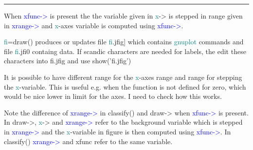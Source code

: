 \vspace{-7mm} \rule{5cm}{0.1pt} 
\onehalfspacing 
\begin{note} 
When \textcolor{blue}{xfunc->} is present the the variable given in \textcolor{teal}{x}-> is stepped in range given in \textcolor{blue}{xrange->} 
and \textcolor{teal}{x}-axes variable is computed using \textcolor{blue}{xfunc->}. 
\end{note} 
\begin{note} 
\textcolor{teal}{fi}=\textcolor{VioletRed}{draw}() produces or updates file \textcolor{teal}{fi}.jfig] which contains 
\textcolor{teal}{gnuplot} commands and file \textcolor{teal}{fi}.jfi0 containg data. If scandic characters are needed 
for labels, the edit these characters into fi.jfig and use \textcolor{VioletRed}{show}('fi.jfig') 
\end{note} 
\begin{note} 
It is possible to have different range for the \textcolor{teal}{x}-axes range and range for stepping 
the \textcolor{teal}{x}-variable. This is useful e.g. when the function is not defined for zero, which would 
be nice lower in limit for the axes. I need to check how this works. 
\end{note} 
\begin{note} 
Note the difference of \textcolor{blue}{xrange->} in \textcolor{VioletRed}{classify}() and draw-> when \textcolor{blue}{xfunc->} is present. 
In draw->, \textcolor{teal}{x}-> and \textcolor{blue}{xrange->} refer to the background variable which is stepped in \textcolor{blue}{xrange->} 
and the \textcolor{teal}{x}-variable in figure is then computed using \textcolor{blue}{xfunc->}. In \textcolor{VioletRed}{classify}() \textcolor{blue}{xrange->} and 
xfunc refer to the same variable. 
\end{note} 
